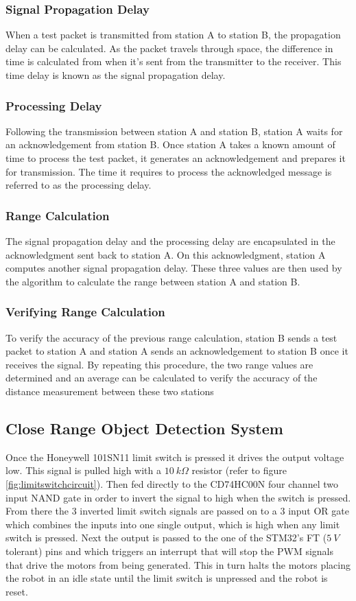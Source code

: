 \documentclass{report}
\begin{document}
    \subsubsection{Signal Propagation Delay}
    When a test packet is transmitted from station A to station B, the propagation delay can be calculated. As the packet travels through space, the difference in time is calculated from when it's sent from the transmitter to the receiver. This time delay is known as the signal propagation delay.

    \subsubsection{Processing Delay}
    Following the transmission between station A and station B, station A waits for an acknowledgement from station B. Once station A takes a known amount of time to process the test packet, it generates an acknowledgement and prepares it for transmission. The time it requires to process the acknowledged message is referred to as the processing delay.

    \subsubsection{Range Calculation}
    The signal propagation delay and the processing delay are encapsulated in the acknowledgment sent back to station A. On this acknowledgment, station A computes another signal propagation delay. These three values are then used by the algorithm to calculate the range between station A and station B.

    \subsubsection{Verifying Range Calculation}
    To verify the accuracy of the previous range calculation, station B sends a test packet to station A and station A sends an acknowledgement to station B once it receives the signal. By repeating this procedure, the two range values are determined and an average can be calculated to verify the accuracy of the distance measurement between these two stations

    \subsection{Close Range Object Detection System}
    Once the Honeywell 101SN11 limit switch is pressed it drives the output voltage low. This signal is pulled high with a $10~k \Omega$ resistor (refer to figure \ref{fig:limitswitchcircuit}). Then fed directly to the CD74HC00N four channel two input NAND gate in order to invert the signal to high when the switch is pressed. From there the 3 inverted limit switch signals are passed on to a 3 input OR gate which combines the inputs into one single output, which is high when any limit switch is pressed. Next the output is passed to the one of the STM32's FT ($5~V$ tolerant) pins and which triggers an interrupt that will stop the PWM signals that drive the motors from being generated. This in turn halts the motors placing the robot in an idle state until the limit switch is unpressed and the robot is reset.
\end{document}
